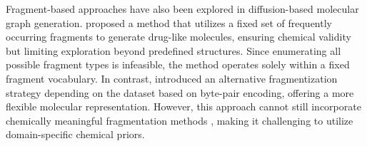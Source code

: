 Fragment-based approaches have also been explored in diffusion-based molecular graph generation. 
\citet{fragment_based_diffusion} proposed a method that utilizes a fixed set of frequently occurring fragments to generate drug-like molecules, ensuring chemical validity but limiting exploration beyond predefined structures. 
Since enumerating all possible fragment types is infeasible, the method operates solely within a fixed fragment vocabulary. 
In contrast, \citet{orgmol_design} introduced an alternative fragmentization strategy depending on the dataset based on byte-pair encoding, offering a more flexible molecular representation.
However, this approach cannot still incorporate chemically meaningful fragmentation methods \citep{brics, emolfrag}, making it challenging to utilize domain-specific chemical priors.